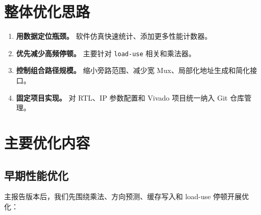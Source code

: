 \documentclass[UTF8,a4paper,12pt]{ctexart}
\newcommand{\code}[1]{\texttt{#1}}
\begin{document}
\section{整体优化思路}

\begin{enumerate}
  \item \textbf{用数据定位瓶颈。} 软件仿真快速统计、添加更多性能计数器。
  \item \textbf{优先减少高频停顿。} 主要针对 \code{load-use} 相关和乘法器。
  \item \textbf{控制组合路径规模。} 缩小旁路范围、减少宽 Mux、局部化地址生成和简化接口。
  \item \textbf{固定项目实现。} 对 RTL、IP 参数配置和 Vivado 项目统一纳入 Git 仓库管理。
\end{enumerate}

\section{主要优化内容}

\subsection{早期性能优化}

主报告版本后，我们先围绕乘法、方向预测、缓存写入和 load-use 停顿开展优化：
\end{document}
